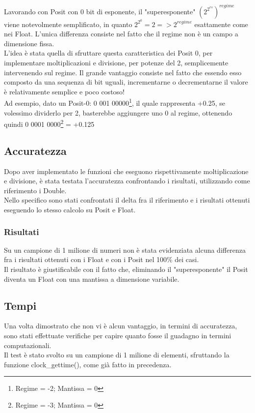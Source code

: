 \documentclass[a4paper,11pt]{article}
\begin{document}
Lavorando con Posit con 0 bit di esponente, il "superesponente" $(2^{2^{es}})^{regime}$ viene notevolmente semplificato, in quanto $2^{2^{0}} = 2 => 2^{regime} $ esattamente come nei Float. L'unica differenza consiste nel fatto che il regime non è un campo a dimensione fissa.\\ L'idea è stata quella di sfruttare questa caratteristica dei Posit 0, per implementare moltiplicazioni e divisione, per potenze del 2, semplicemente intervenendo sul regime. Il grande vantaggio consiste nel fatto che essendo esso composto da una sequenza di bit uguali, incrementarne o decrementarne il valore è relativamente semplice e poco costoso!\\
Ad esempio, dato un Posit-0: 0 001 00000\footnote{Regime = -2; Mantissa = 0}, il quale rappresenta +0.25, se volessimo dividerlo per 2, basterebbe aggiungere uno 0 al regime, ottenendo quindi 0 0001 0000\footnote{Regime = -3; Mantissa = 0} = +0.125

\subsection{Accuratezza}

Dopo aver implementato le funzioni che eseguono rispettivamente moltiplicazione e divisione, è stata testata l'accuratezza confrontando i risultati, utilizzando come riferimento i Double. \\
Nello specifico sono stati confrontati il delta fra il riferimento e i risultati ottenuti eseguendo lo stesso calcolo su Posit e Float.

\subsubsection{Risultati} 

Su un campione di 1 milione di numeri non è stata evidenziata alcuna differenza fra i risultati ottenuti con i Float e con i Posit nel 100\% dei casi.\\
Il risultato è giustificabile con il fatto che, eliminando il "superesponente" il Posit diventa un Float con una mantissa a dimensione variabile.

\subsection{Tempi}
Una volta dimostrato che non vi è alcun vantaggio, in termini di accuratezza, sono stati effettuate verifiche per capire quanto fosse il guadagno in termini computazionali.\\
Il test è stato svolto su un campione di 1 milione di elementi, sfruttando la funzione clock\_gettime(), come già fatto in precedenza.
\end{document}
